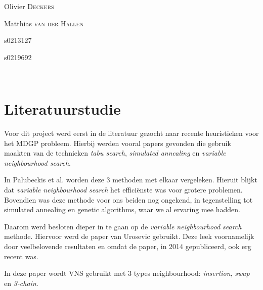 \documentclass[pdftex,12pt,a4paper]{article}
\begin{document}
\begin{titlepage}
\begin{center}
\begin{minipage}{0.4\textwidth}
\begin{flushleft} \large
Olivier \textsc{Deckers} \\
\end{flushleft}
\begin{flushleft} \large
Matthias \textsc{van der Hallen} \\
\end{flushleft}
\end{minipage}
\begin{minipage}{0.4\textwidth}
\begin{flushright} \large
s0213127
\end{flushright}
\begin{flushright} \large
s0219692\\
\end{flushright}
\end{minipage}\\[1cm]

\end{center}

\end{titlepage}

\thispagestyle{empty}  
\enlargethispage{10\baselineskip}
\setcounter{page}{0}
\newpage
\setcounter{page}{1}

\section{Literatuurstudie}
Voor dit project werd eerst in de literatuur gezocht naar recente heuristieken voor het MDGP probleem. Hierbij werden vooral papers gevonden die gebruik maakten van de technieken \emph{tabu search}, \emph{simulated annealing} en \emph{variable neighbourhood search}.

In Palubeckis et al.\cite{Palubeckis} worden deze 3 methoden met elkaar vergeleken. Hieruit blijkt dat \emph{variable neighbourhood search} het effici\"enste was voor grotere problemen. Bovendien was deze methode voor ons beiden nog ongekend, in tegenstelling tot simulated annealing en genetic algorithms, waar we al ervaring mee hadden.

Daarom werd besloten dieper in te gaan op de \emph{variable neighbourhood search} methode. Hiervoor werd de paper van Urosevic\cite{Urosevic} gebruikt. Deze leek voornamelijk door veelbelovende resultaten en omdat de paper, in 2014 gepubliceerd, ook erg recent was. 

In deze paper wordt VNS gebruikt met 3 types neighbourhood: \emph{insertion}, \emph{swap} en \emph{3-chain}.
\end{document}
